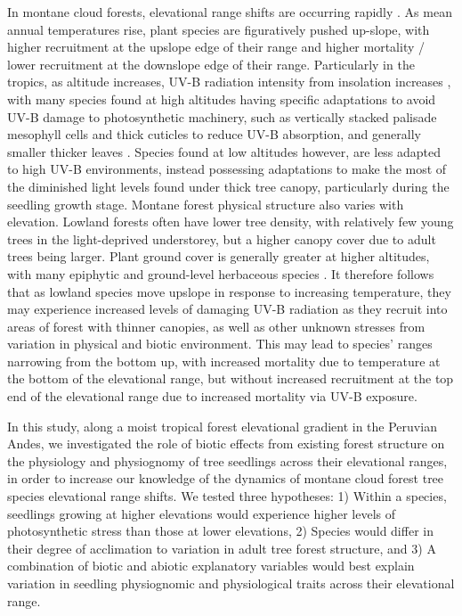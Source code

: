 \documentclass[a4paper, 11pt]{article}
\begin{document}
In montane cloud forests, elevational range shifts are occurring rapidly \citep{Feeley2011}. As mean annual temperatures rise, plant species are figuratively pushed up-slope, with higher recruitment at the upslope edge of their range and higher mortality / lower recruitment at the downslope edge of their range. Particularly in the tropics, as altitude increases, UV-B radiation intensity from insolation increases \citep{Prado2011}, with many species found at high altitudes having specific adaptations to avoid UV-B damage to photosynthetic machinery, such as vertically stacked palisade mesophyll cells and thick cuticles to reduce UV-B absorption, and generally smaller thicker leaves \citep{Prado2011}. Species found at low altitudes however, are less adapted to high UV-B environments, instead possessing adaptations to make the most of the diminished light levels found under thick tree canopy, particularly during the seedling growth stage. Montane forest physical structure also varies with elevation. Lowland forests often have lower tree density, with relatively few young trees in the light-deprived understorey, but a higher canopy cover due to adult trees being larger. Plant ground cover is generally greater at higher altitudes, with many epiphytic and ground-level herbaceous species \citep{Martin2010}. It therefore follows that as lowland species move upslope in response to increasing temperature, they may experience increased levels of damaging UV-B radiation as they recruit into areas of forest with thinner canopies, as well as other unknown stresses from variation in physical and biotic environment. This may lead to species' ranges narrowing from the bottom up, with increased mortality due to temperature at the bottom of the elevational range, but without increased recruitment at the top end of the elevational range due to increased mortality via UV-B exposure.

In this study, along a moist tropical forest elevational gradient in the Peruvian Andes, we investigated the role of biotic effects from existing forest structure on the physiology and physiognomy of tree seedlings across their elevational ranges, in order to increase our knowledge of the dynamics of montane cloud forest tree species elevational range shifts. We tested three hypotheses: 1) Within a species, seedlings growing at higher elevations would experience higher levels of photosynthetic stress than those at lower elevations, 2) Species would differ in their degree of acclimation to variation in adult tree forest structure, and 3) A combination of biotic and abiotic explanatory variables would best explain variation in seedling physiognomic and physiological traits across their elevational range.
\end{document}

